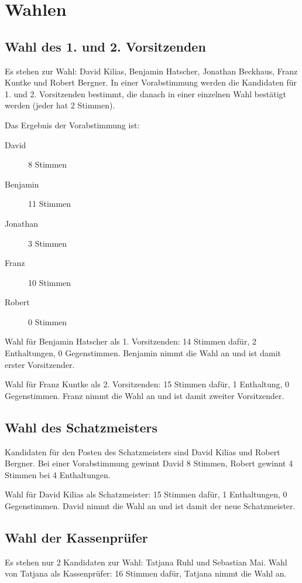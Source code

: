 \documentclass[a4paper,12pt,titlepage]{scrartcl}
\begin{document}
\section{Wahlen}

\subsection{Wahl des 1. und 2. Vorsitzenden }
Es stehen zur Wahl: David Kilias, Benjamin Hatscher, Jonathan Beckhaus, Franz Kuntke und Robert Bergner. In einer Vorabstimmung werden die Kandidaten für 1. und 2. Vorsitzenden bestimmt, die danach in einer einzelnen Wahl bestätigt werden (jeder hat 2 Stimmen).

Das Ergebnis der Vorabstimmung ist: 
\begin{description}
	\item[David] 8 Stimmen
	\item[Benjamin] 11 Stimmen
	\item[Jonathan] 3 Stimmen
	\item[Franz] 10 Stimmen
	\item[Robert] 0 Stimmen
\end{description}
    
Wahl für Benjamin Hatscher als 1. Vorsitzenden: 14 Stimmen dafür, 2 Enthaltungen, 0 Gegenstimmen. Benjamin nimmt die Wahl an und ist damit erster Vorsitzender.
    
Wahl für Franz Kuntke als 2. Vorsitzenden: 15 Stimmen dafür, 1 Enthaltung, 0 Gegenstimmen. Franz nimmt die Wahl an und ist damit zweiter Vorsitzender.


\subsection{ Wahl des Schatzmeisters }
Kandidaten für den Posten des Schatzmeisters sind David Kilias und Robert Bergner. Bei einer Vorabstimmung gewinnt David 8 Stimmen, Robert gewinnt 4 Stimmen bei 4 Enthaltungen.

Wahl für David Kilias als Schatzmeister: 15 Stimmen dafür, 1 Enthaltungen, 0 Gegenstimmen. David nimmt die Wahl an und ist damit der neue Schatzmeister.


\subsection{ Wahl der Kassenprüfer }
Es stehen nur 2 Kandidaten zur Wahl: Tatjana Ruhl und Sebastian Mai.
Wahl von Tatjana als Kassenprüfer: 16 Stimmen dafür, Tatjana nimmt die Wahl an.
\end{document}
